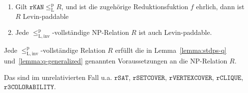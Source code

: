 \begin{observation}\label{obs:invcomplete-sind-levinpaddable}
    \begin{enumerate}
        \item Gilt $\mathtt{rKAN}\leq_\mathrm{L}^\mathrm{p} R$, und ist die zugehörige Reduktionsfuktion $f$ ehrlich, dann ist $R$ Levin-paddable
        \item Jede $\leq_\mathrm{L,inv}^\mathrm{p}$-vollständige NP-Relation $R$ ist auch Levin-paddable.
    \end{enumerate}
\end{observation}
\begin{corollary}
    Jede $\leq_\mathrm{L,inv}^\mathrm{p}$-vollständige Relation $R$ erfüllt die in 
    Lemma~\ref{lemma:stdps-q} und~\ref{lemma:q-generalized} genannten Voraussetzungen an die NP-Relation $R$.

    Das sind im unrelativierten Fall u.a. $\mathtt{rSAT}$, $\mathtt{rSETCOVER}$, $\mathtt{rVERTEXCOVER}$, $\mathtt{rCLIQUE}$, $\mathtt{r3COLORABILITY}$.
\end{corollary}
